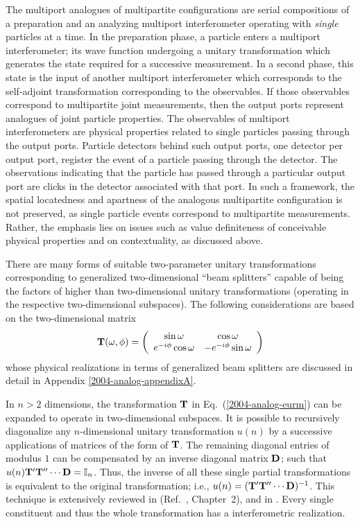 \documentclass[pra,preprint,showpacs,showkeys,amsfonts]{revtex4}
\begin{document}
The multiport analogues of multipartite configurations
are serial compositions of a preparation and an analyzing multiport interferometer
operating with {\em single} particles at a time.
In the preparation phase, a particle enters a multiport interferometer;
its wave function undergoing a unitary transformation which generates the
state required for a successive measurement.
In a second phase, this state is the input of another multiport interferometer
which corresponds to the self-adjoint transformation corresponding to the observables.
If those observables correspond to multipartite joint measurements, then
the output ports represent analogues of joint particle properties.
The observables of multiport interferometers are
physical properties related to single particles passing through
the output ports.
Particle detectors behind such output ports, one detector per output port,
register the event of
a particle passing through the detector.
The observations indicating that the particle has passed
through a particular output port are clicks in the detector associated with that port.
In such a framework,
the spatial locatedness and apartness of the analogous multipartite configuration
is not preserved,
as single particle events correspond to multipartite measurements.
Rather, the emphasis lies on issues such as value definiteness of conceivable physical properties
and  on contextuality, as discussed above.

There are many forms of suitable two-parameter unitary transformations
corresponding to generalized two-dimensional ``beam splitters''
capable of being the factors of higher than two-dimensional unitary transformations
(operating in the respective two-dimensional subspaces).
The following considerations are based on the two-dimensional matrix
\begin{equation}
{\bf T}(\omega ,\phi )=
\left(
\begin{array}{cc}
\sin \omega &\cos  \omega \\
e^{-i \phi }\cos  \omega & -e^{-i \phi }\sin \omega
\end{array}
\right)
\label{2004-analog-eurm}
\end{equation}
whose physical realizations in terms of generalized beam splitters
are discussed in detail in Appendix \ref{2004-analog-appendixA}.

In $n>2$ dimensions,
the transformation ${\bf T}$ in Eq.~(\ref{2004-analog-eurm}) can be expanded to operate
in two-dimensional subspaces.
It is possible to recursively diagonalize any $n$-dimensional unitary transformation
$u(n)$ by
a successive applications of matrices of the form of ${\bf T}$.
The remaining diagonal entries of modulus $1$
can be compensated by an inverse diagonal matrix ${\bf D}$; such that
$u(n){\bf T}'{\bf T}'' \cdots {\bf D} ={\Bbb I}_n$.
Thus,
the inverse of all these single partial transformations is equivalent to the original transformation;
i.e., $u(n)=({\bf T}'{\bf T}'' \cdots {\bf D})^{-1}$.
This technique is extensively reviewed in (Ref.~\cite{murnaghan}, Chapter~2),
and in \cite{rzbb,reck-94}.
Every single constituent and thus the whole transformation has a
interferometric realization.
\end{document}
